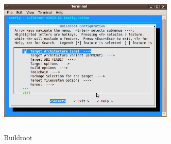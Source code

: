 \begin{figure}[ht]
	\centering
	\includegraphics[width=3.5in, height=3in]{images/buildroot.png}
	\caption{Buildroot}
\end{figure}

